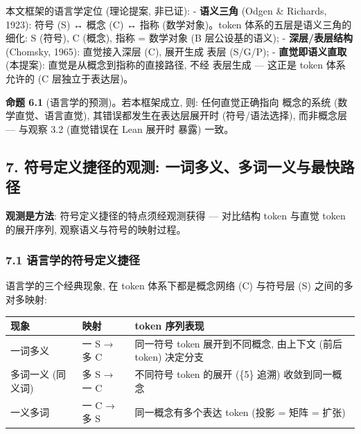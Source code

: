 \documentclass[
]{article}
\begin{document}
本文框架的语言学定位 (理论提案, 非已证): - \textbf{语义三角} (Odgen \&
Richards, 1923): 符号 (S) ↔ 概念 (C) ↔ 指称 (数学对象)。token
体系的五层是语义三角的细化: S (符号), C (概念), 指称 = 数学对象 (B
层公设基的语义); - \textbf{深层/表层结构} (Chomsky, 1965): 直觉接入深层
(C), 展开生成 表层 (S/G/P); - \textbf{直觉即语义直取} (本提案):
直觉是从概念到指称的直接路径, 不经 表层生成 --- 这正是 token 体系允许的
(C 层独立于表达层)。

\textbf{命题 6.1} (语言学的预测)。若本框架成立, 则: 任何直觉正确指向
概念的系统 (数学直觉、语言直觉), 其错误都发生在表达层展开时
(符号/语法选择), 而非概念层 --- 与观察 3.2 (直觉错误在 Lean 展开时 暴露)
一致。

\subsection{7. 符号定义捷径的观测:
一词多义、多词一义与最快路径}\label{ux7b26ux53f7ux5b9aux4e49ux6377ux5f84ux7684ux89c2ux6d4b-ux4e00ux8bcdux591aux4e49ux591aux8bcdux4e00ux4e49ux4e0eux6700ux5febux8defux5f84}

\textbf{观测是方法}: 符号定义捷径的特点须经观测获得 --- 对比结构 token
与直觉 token 的展开序列, 观察语义与符号的映射过程。

\subsubsection{7.1
语言学的符号定义捷径}\label{ux8bedux8a00ux5b66ux7684ux7b26ux53f7ux5b9aux4e49ux6377ux5f84}

语言学的三个经典现象, 在 token 体系下都是概念网络 (C) 与符号层 (S)
之间的多对多映射:

\begin{longtable}[]{@{}
  >{\raggedright\arraybackslash}p{}
  >{\raggedright\arraybackslash}p{}
  >{\raggedright\arraybackslash}p{}@{}}
\toprule\noalign{}
\begin{minipage}[b]{\linewidth}\raggedright
现象
\end{minipage} & \begin{minipage}[b]{\linewidth}\raggedright
映射
\end{minipage} & \begin{minipage}[b]{\linewidth}\raggedright
token 序列表现
\end{minipage} \\
\midrule\noalign{}
\endhead
\bottomrule\noalign{}
\endlastfoot
一词多义 & 一 S → 多 C & 同一符号 token 展开到不同概念, 由上下文 (前后
token) 决定分支 \\
多词一义 (同义词) & 多 S → 一 C & 不同符号 token 的展开 (\{5\} 追溯)
收敛到同一概念 \\
一义多词 & 一 C → 多 S & 同一概念有多个表达 token (投影 = 矩阵 =
扩张) \\
\end{longtable}
\end{document}
